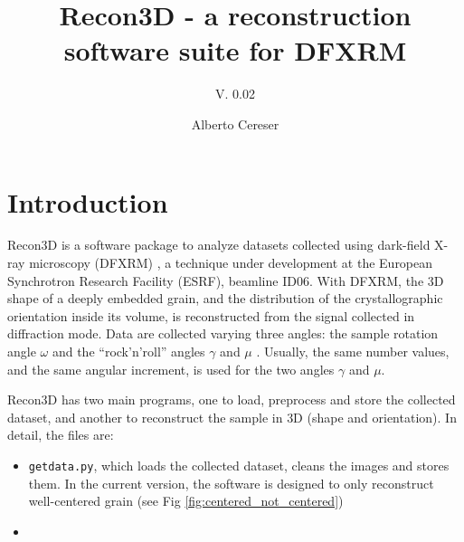 \documentclass[11pt]{scrartcl}
\begin{document}
%
\author{Alberto Cereser}
\title{Recon3D - a reconstruction software suite for DFXRM}
\subtitle{V. 0.02}
\maketitle

\tableofcontents

\section{Introduction}

Recon3D is a software package to analyze datasets collected using dark-field X-ray microscopy ({\footnotesize{DFXRM}}) {\cite{dfxrm_nat_comm}}, a technique under development at the European Synchrotron Research Facility ({\footnotesize{ESRF}}), beamline {\footnotesize{ID06}}. With {\footnotesize{DFXRM}}, the {\footnotesize{3D}} shape of a deeply embedded grain, and the distribution of the crystallographic orientation inside its volume, is reconstructed from the signal collected in diffraction mode. Data are collected varying three angles: the sample rotation angle $\omega$ and the ``rock'n'roll'' angles $\gamma$ and $\mu$ \cite{henning_joac}. Usually, the same number values, and the same angular increment, is used for the two angles $\gamma$ and $\mu$. 

Recon3D has two main programs, one to load, preprocess and store the collected dataset, and another to reconstruct the sample in {\footnotesize{3D}} (shape and orientation). In detail, the files are:
\begin{itemize}
    \item {\texttt{getdata.py}}, which loads the collected dataset, cleans the images and stores them. In the current version, the software is designed to only reconstruct well-centered grain (see Fig \ref{fig:centered_not_centered})
    \item 
\end{itemize}
\end{document}
